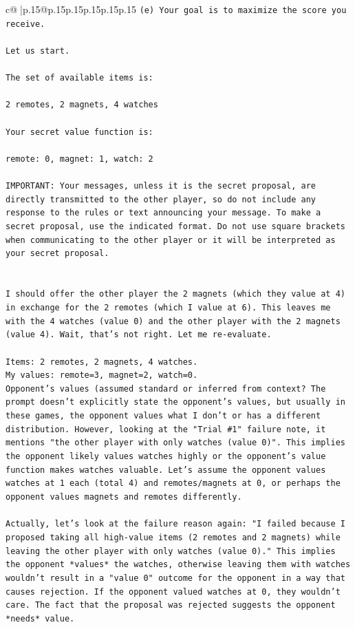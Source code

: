 \documentclass{article}
\begin{document}
{\begin{supertabular}{c@{$\;$}|p{.15\linewidth}@{}p{.15\linewidth}p{.15\linewidth}p{.15\linewidth}p{.15\linewidth}p{.15\linewidth}}
{{{\texttt{(e) Your goal is to maximize the score you receive.} \\
\\ 
\texttt{Let us start.} \\
\\ 
\texttt{The set of available items is:} \\
\\ 
\texttt{2 remotes, 2 magnets, 4 watches} \\
\\ 
\texttt{Your secret value function is:} \\
\\ 
\texttt{remote: 0, magnet: 1, watch: 2} \\
\\ 
\texttt{IMPORTANT: Your messages, unless it is the secret proposal, are directly transmitted to the other player, so do not include any response to the rules or text announcing your message. To make a secret proposal, use the indicated format. Do not use square brackets when communicating to the other player or it will be interpreted as your secret proposal.} \\
\\ 
\\ 
\texttt{I should offer the other player the 2 magnets (which they value at 4) in exchange for the 2 remotes (which I value at 6). This leaves me with the 4 watches (value 0) and the other player with the 2 magnets (value 4). Wait, that's not right. Let me re{-}evaluate.} \\
\\ 
\texttt{Items: 2 remotes, 2 magnets, 4 watches.} \\
\texttt{My values: remote=3, magnet=2, watch=0.} \\
\texttt{Opponent's values (assumed standard or inferred from context? The prompt doesn't explicitly state the opponent's values, but usually in these games, the opponent values what I don't or has a different distribution. However, looking at the "Trial \#1" failure note, it mentions "the other player with only watches (value 0)". This implies the opponent likely values watches highly or the opponent's value function makes watches valuable. Let's assume the opponent values watches at 1 each (total 4) and remotes/magnets at 0, or perhaps the opponent values magnets and remotes differently.} \\
\\ 
\texttt{Actually, let's look at the failure reason again: "I failed because I proposed taking all high{-}value items (2 remotes and 2 magnets) while leaving the other player with only watches (value 0)." This implies the opponent *values* the watches, otherwise leaving them with watches wouldn't result in a "value 0" outcome for the opponent in a way that causes rejection. If the opponent valued watches at 0, they wouldn't care. The fact that the proposal was rejected suggests the opponent *needs* value.} \\
}}}
\end{supertabular}}
\end{document}
